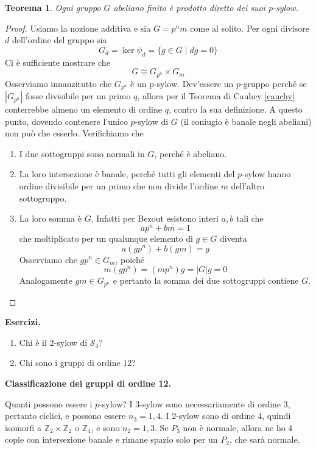 \documentclass[a4paper]{article}
\newtheorem{theorem}{Teorema}[section]
\theoremstyle{remark}
\theoremstyle{definition}
\newcommand{\Z}{\mathbb{Z}}
\begin{document}
\begin{multicols}{2}
\begin{theorem}
	Ogni gruppo $ G $ abeliano finito è prodotto diretto dei suoi $ p $-sylow.
\end{theorem}
\begin{proof}
	Usiamo la nozione additiva e sia $ G = p^nm $ come al solito. Per ogni divisore $ d$ dell'ordine del gruppo sia
	\[ G_d = \ker\psi_d = \{ g \in G \mid dg = 0 \} \]
	Ci è sufficiente mostrare che
	\[ G \cong G_{p^n} \times G_m \]
	Osserviamo innanzitutto che $ G_{p^n} $ è un p-sylow. Dev'essere un $ p $-gruppo perché se $ |G_{p^n}| $ fosse divisibile per un primo $ q $, allora per il Teorema di Cauhcy \ref{cauchy} conterrebbe almeno un elemento di ordine $ q $, contro la sua definizione. A questo punto, dovendo contenere l'unico $ p $-sylow di $ G $  (il coniugio è banale negli abeliani) non può che esserlo.
	Verifichiamo che
	\begin{enumerate}
		\item I due sottogruppi sono normali in $ G $, perché è abeliano.
		\item La loro intersezione è banale, perché tutti gli elementi del $ p $-sylow hanno ordine divisibile per un primo che non divide l'ordine $ m $ dell'altro sottogruppo.
		\item La loro somma è $ G $. Infatti per Bezout esistono interi $ a, b $ tali che
		\[ ap^n + bm = 1 \]
		che moltiplicato per un qualunque elemento di $ g \in G $ diventa
		\[ a(gp^n) + b(gm) = g \]
		Osserviamo che $ gp^n \in G_{m} $, poiché $$  m (gp^n) = (mp^n) g = |G| g = 0  $$
		Analogamente $ gm \in G_{p^n} $ e pertanto la somma dei due sottogruppi contiene $ G $.
	\end{enumerate}
\end{proof}

\textbf{Esercizi.}
\begin{enumerate}
	\item Chi è il 2-sylow di $ \mathcal{S}_4 $?
	\item Chi sono i gruppi di ordine $ 12 $?
\end{enumerate}
\bigskip
\textbf{Classificazione dei gruppi di ordine 12.}

Quanti possono essere i $ p $-sylow?
I 3-sylow sono necessariamente di ordine $ 3 $, pertanto ciclici, e possono essere $ n_3 = 1, 4 $. I 2-sylow sono di ordine $ 4 $, quindi isomorfi a $ \Z_2 \times \Z_2 $ o $ \Z_4 $, e sono $ n_2 = 1, 3 $. Se $ P_3 $ non è normale, allora ne ho 4 copie con intersezione banale e rimane spazio solo per un $ P_2 $, che sarà normale.


\end{multicols}
\end{document}
